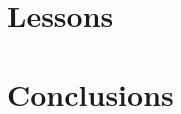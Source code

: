 \documentclass{sig-alternate}
\begin{document}
\section{Lessons}
\label{sec:lessons}
\section{Conclusions}



\end{document}
